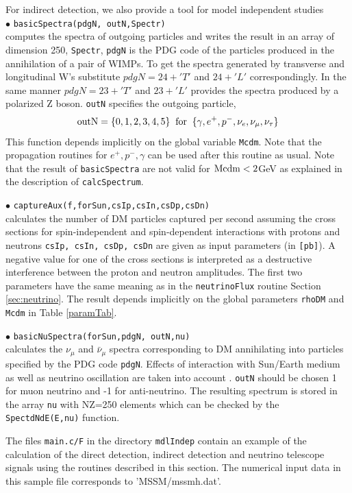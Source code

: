 \documentclass[12pt,a4paper]{article}
\begin{document}
For indirect detection, we also provide a tool for model independent studies\\ 
\noindent
$\bullet$ \verb|basicSpectra(pdgN, outN,Spectr)|\\
computes the spectra of outgoing particles and writes the result in an array of dimension 250, \verb|Spectr|,
\verb|pdgN| is the PDG code of the particles produced in the annihilation of a pair of 
WIMPs. To get the spectra generated by transverse and longitudinal W's substitute 
$ pdgN=24+'T'$ and $24+'L'$ correspondingly. In the same manner $pdgN=23+'T'$ and
$23+'L'$  provides the spectra produced by a polarized Z boson.
 \verb|outN|  specifies the outgoing particle,
$$ {\rm outN} = \{0,1,2,3,4,5\} \;\; {\rm for}\;\; \{\gamma,   e^+,  p^-, \nu_e,
\nu_{\mu},\nu_{\tau}\} $$
This function depends implicitly on the global variable  {\tt Mcdm}.
Note that the  propagation routines for $e^+,p^-,\gamma$ can be used after 
this routine as usual. Note that the result of {\tt basicSpectra}
are not valid for ${\rm Mcdm} < 2$GeV as explained in the description of {\tt calcSpectrum}.

\noindent $\bullet$ \verb|captureAux(f,forSun,csIp,csIn,csDp,csDn)|\\
calculates the number of DM particles captured per second assuming the cross sections
for  spin-independent and spin-dependent 
interactions with protons and neutrons   {\tt csIp, csIn, csDp, csDn} are
given as input parameters (in {\tt [pb]}). 
A negative value for one of the cross sections  is interpreted as a destructive
interference between the  proton and neutron amplitudes. The first two
parameters have the same meaning as in the {\tt neutrinoFlux} routine Section \ref{sec:neutrino}. The
result  depends implicitly on the global parameters {\tt rhoDM} and {\tt
Mcdm} in Table \ref{paramTab}. 


\noindent
$\bullet$ \verb|basicNuSpectra(forSun,pdgN, outN,nu)|\\
calculates the $\nu_{\mu}$ and $\bar{\nu}_{\mu}$  spectra corresponding to  DM annihilating into particles specified by the PDG code {\tt pdgN}. Effects of interaction with Sun/Earth medium as well as neutrino oscillation  are taken into account \cite{Cirelli:2005gh}.
{\tt outN} should be chosen 1 for muon neutrino and -1 for anti-neutrino. The resulting spectrum is stored in the array 
  \verb|nu| with NZ=250 elements  which can be checked by the {\tt SpectdNdE(E,nu)}
function.


The files {\verb|main.c/F|} in the directory {\tt mdlIndep}  contain an example of the calculation of the direct detection,  indirect detection
and neutrino telescope signals using the routines described in this section. 
The numerical input data in this sample file corresponds to 'MSSM/mssmh.dat'. 
\end{document}
